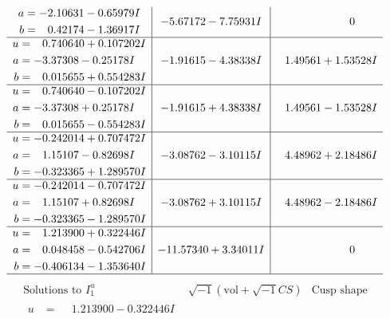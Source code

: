 \documentclass[1p]{elsarticle_modified}
\theoremstyle{definition}
\newcommand{\I}{\sqrt{-1}}
\begin{document}
$$\begin{array}{c|c|c}
\begin{aligned}
a &= -2.10631 - 0.65979 I \\
b &= \phantom{-}0.42174 - 1.36917 I\end{aligned}
 & -5.67172 - 7.75931 I & \phantom{-0.000000 } 0 \\ \hline\begin{aligned}
u &= \phantom{-}0.740640 + 0.107202 I \\
a &= -3.37308 - 0.25178 I \\
b &= \phantom{-}0.015655 + 0.554283 I\end{aligned}
 & -1.91615 - 4.38338 I & \phantom{-}1.49561 + 1.53528 I \\ \hline\begin{aligned}
u &= \phantom{-}0.740640 - 0.107202 I \\
a &= -3.37308 + 0.25178 I \\
b &= \phantom{-}0.015655 - 0.554283 I\end{aligned}
 & -1.91615 + 4.38338 I & \phantom{-}1.49561 - 1.53528 I \\ \hline\begin{aligned}
u &= -0.242014 + 0.707472 I \\
a &= \phantom{-}1.15107 - 0.82698 I \\
b &= -0.323365 + 1.289570 I\end{aligned}
 & -3.08762 - 3.10115 I & \phantom{-}4.48962 + 2.18486 I \\ \hline\begin{aligned}
u &= -0.242014 - 0.707472 I \\
a &= \phantom{-}1.15107 + 0.82698 I \\
b &= -0.323365 - 1.289570 I\end{aligned}
 & -3.08762 + 3.10115 I & \phantom{-}4.48962 - 2.18486 I \\ \hline\begin{aligned}
u &= \phantom{-}1.213900 + 0.322446 I \\
a &= \phantom{-}0.048458 - 0.542706 I \\
b &= -0.406134 - 1.353640 I\end{aligned}
 & -11.57340 + 3.34011 I & \phantom{-0.000000 } 0\\
 \hline 
 \end{array}$$\newpage$$\begin{array}{c|c|c}  
\text{Solutions to }I^u_{1}& \I (\text{vol} + \sqrt{-1}CS) & \text{Cusp shape}\\
 \hline 
\begin{aligned}
u &= \phantom{-}1.213900 - 0.322446 I \\

\end{aligned}
\end{array}$$
\end{document}
